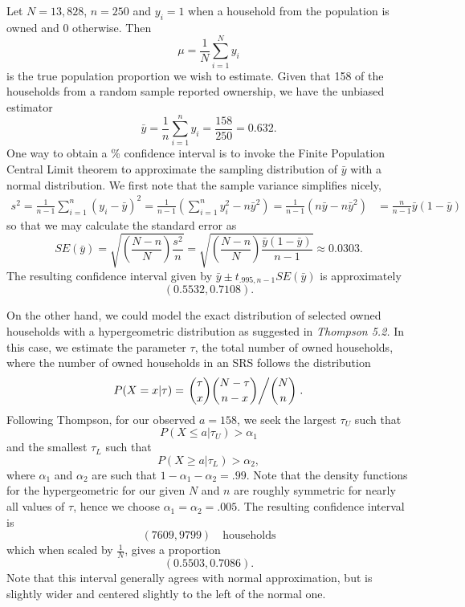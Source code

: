 \documentclass{homework}
\begin{document}
\begin{solution}
Let $N=13,828$, $n=250$ and $y_i = 1$ when a household from the population is owned and $0$ otherwise.  Then 
$$
  \mu = \frac 1N \sum_{i=1}^N y_i
$$
is the true population proportion we wish to estimate. Given that 158 of the households from a random sample reported ownership, we have the unbiased estimator
$$
  \bar y = \frac 1n \sum_{i=1}^n y_i = \frac {158}{250} = 0.632.
$$
One way to obtain a \unit[99]{\%} confidence interval is to invoke the Finite Population Central Limit theorem to approximate the sampling distribution of $\bar y$ with a normal distribution.  We first note that the sample variance simplifies nicely,
\begin{align*}
  s^2 = \frac{1}{n-1} \sum_{i=1}^n(y_i - \bar y)^2 = \frac 1{n-1}\left( \sum_{i=1}^n y_i^2 - n\bar y^2 \right) = \frac 1{n-1}\left( n\bar y - n\bar y^2\right) &= \frac{n}{n-1}\bar y(1-\bar y)
\end{align*}
so that we may calculate the standard error as
$$
  SE(\bar y) = \sqrt{\left(\frac{N-n}N\right) \frac{s^2}n}= \sqrt{\left(\frac{N-n}N\right)\frac{\bar y(1-\bar y)}{n-1}} \approx 0.0303.
$$
The resulting confidence interval given by $\bar y \pm t_{.995,n-1}SE(\bar y)$ is  approximately
$$
   (0.5532, 0.7108).
$$

On the other hand, we could model the exact distribution of selected owned households with a hypergeometric distribution as suggested in \emph{Thompson 5.2.}  In this case, we estimate the parameter $\tau$, the total number of owned households, where the number of owned households in an SRS follows the distribution
$$
  P(X=x|\tau) = \left.\binom \tau x \binom {N-\tau}{n-x} \middle/ \binom Nn \right..
$$
Following Thompson, for our observed $a=158$, we seek the largest $\tau_U$ such that
$$
  P(X\le a|\tau_U) > \alpha_1
$$ 
and the smallest $\tau_L$ such that
$$
  P(X\ge a|\tau_L) > \alpha_2,
$$
where $\alpha_1$ and $\alpha_2$ are such that $1-\alpha_1-\alpha_2 = .99$.  Note that the density functions for the hypergeometric for our given $N$ and $n$ are roughly symmetric for nearly all values of $\tau$, hence we choose $\alpha_1 = \alpha_2 = .005$. The resulting confidence interval is
$$
  (7609,9799)\quad\text{households}
$$
which when scaled by $\frac 1N$, gives a proportion
$$
  (0.5503,0.7086).
$$
Note that this interval generally agrees with normal approximation, but is slightly wider and centered slightly to the left of the normal one.
\end{solution}
\end{document}
